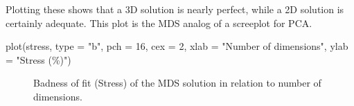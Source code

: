 \documentclass[
  letterpaper,
  10pt,
  krantz2]{krantz}
\makeatletter
\newenvironment{Shaded}{\begin{snugshade}}{\end{snugshade}}
\newcommand{\AttributeTok}[1]{\textcolor[rgb]{0.40,0.45,0.13}{#1}}
\newcommand{\CommentTok}[1]{\textcolor[rgb]{0.37,0.37,0.37}{#1}}
\newcommand{\ConstantTok}[1]{\textcolor[rgb]{0.56,0.35,0.01}{#1}}
\newcommand{\ControlFlowTok}[1]{\textcolor[rgb]{0.00,0.23,0.31}{\textbf{#1}}}
\newcommand{\DecValTok}[1]{\textcolor[rgb]{0.68,0.00,0.00}{#1}}
\newcommand{\FunctionTok}[1]{\textcolor[rgb]{0.28,0.35,0.67}{#1}}
\newcommand{\NormalTok}[1]{\textcolor[rgb]{0.00,0.23,0.31}{#1}}
\newcommand{\OtherTok}[1]{\textcolor[rgb]{0.00,0.23,0.31}{#1}}
\newcommand{\SpecialCharTok}[1]{\textcolor[rgb]{0.37,0.37,0.37}{#1}}
\newcommand{\StringTok}[1]{\textcolor[rgb]{0.13,0.47,0.30}{#1}}
\newenvironment{kframe}{%
  \medskip{}
  \setlength{\fboxsep}{.8em}
  \def\at@end@of@kframe{}%
  \ifinner\ifhmode%
  \def\at@end@of@kframe{\end{minipage}}%
  \begin{minipage}{\columnwidth}%
  \fi\fi%
  \def\FrameCommand##1{\hskip\@totalleftmargin \hskip-\fboxsep
  \colorbox{shadecolor}{##1}\hskip-\fboxsep
      \hskip-\linewidth \hskip-\@totalleftmargin \hskip\columnwidth}%
  \MakeFramed {\advance\hsize-\width
    \@totalleftmargin\z@ \linewidth\hsize
    \@setminipage}}%
{\par\unskip\endMakeFramed%
  \at@end@of@kframe}
\renewenvironment{Shaded}{\begin{kframe}}{\end{kframe}}
\makeatother
\begin{document}
\begin{Shaded}
\end{Shaded}

Plotting these shows that a 3D solution is nearly perfect, while a 2D
solution is certainly adequate. This plot is the MDS analog of a
screeplot for PCA.

\begin{Shaded}
\begin{Highlighting}[]
\FunctionTok{plot}\NormalTok{(stress, }\AttributeTok{type =} \StringTok{"b"}\NormalTok{, }\AttributeTok{pch =} \DecValTok{16}\NormalTok{, }\AttributeTok{cex =} \DecValTok{2}\NormalTok{,}
     \AttributeTok{xlab =} \StringTok{"Number of dimensions"}\NormalTok{,}
     \AttributeTok{ylab =} \StringTok{"Stress (\%)"}\NormalTok{)}
\end{Highlighting}
\end{Shaded}

\begin{figure}


\caption{\label{fig-diabetes-stress}Badness of fit (Stress) of the MDS
solution in relation to number of dimensions.}

\end{figure}%
\end{document}
